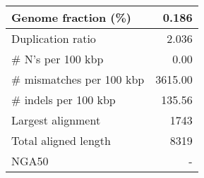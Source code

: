 \documentclass[12pt,a4paper]{article}
\begin{document}
\begin{table}[ht]
\begin{center}
\begin{tabular}{|l*{1}{|r}|}
Genome fraction (\%) & 0.186 \\ \hline
Duplication ratio & 2.036 \\ \hline
\# N's per 100 kbp & 0.00 \\ \hline
\# mismatches per 100 kbp & 3615.00 \\ \hline
\# indels per 100 kbp & 135.56 \\ \hline
Largest alignment & 1743 \\ \hline
Total aligned length & 8319 \\ \hline
NGA50 & - \\ \hline
\end{tabular}
\end{center}
\end{table}
\end{document}
